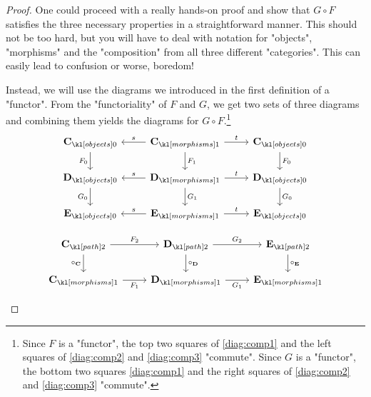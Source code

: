\documentclass[main.tex]{subfiles}
\begin{document}
\begin{proof}
	One could proceed with a really hands-on proof and show that $G \circ F$ satisfies the three necessary properties in a straightforward manner. This should not be too hard, but you will have to deal with notation for "objects", "morphisms" and the "composition" from all three different "categories". This can easily lead to confusion or worse, boredom!
	
	Instead, we will use the diagrams we introduced in the first definition of a "functor". From the "functoriality" of $F$ and $G$, we get two sets of three diagrams and combining them yields the diagrams for $G \circ F$.\footnote{Since $F$ is a "functor", the top two squares of \eqref{diag:comp1} and the left squares of \eqref{diag:comp2} and \eqref{diag:comp3} "commute". Since $G$ is a "functor", the bottom two squares \eqref{diag:comp1} and the right squares of \eqref{diag:comp2} and \eqref{diag:comp3} "commute".}
	\begin{equation}\label{diag:comp1}
		\begin{tikzcd}
			\obj{\mathbf{C}} \arrow[d, "F_0"'] & \mor{\mathbf{C}} \arrow[d, "F_1"] \arrow[r, "t"] \arrow[l, "s"'] & \obj{\mathbf{C}} \arrow[d, "F_0"] \\
			\obj{\mathbf{D}} \arrow[d, "G_0"'] & \mor{\mathbf{D}} \arrow[d, "G_1"] \arrow[r, "t"] \arrow[l, "s"'] & \obj{\mathbf{D}} \arrow[d, "G_0"] \\
			\obj{\mathbf{E}}                   & \mor{\mathbf{E}} \arrow[r, "t"] \arrow[l, "s"']                  & \obj{\mathbf{E}}                 
		\end{tikzcd}
	\end{equation}
	\begin{minipage}{0.49\textwidth}
		\begin{equation}\label{diag:comp2}
			\begin{tikzcd}
				\mortwo{\mathbf{C}} \arrow[r, "F_2"] \arrow[d, "\circ_{\mathbf{C}}"'] & \mortwo{\mathbf{D}} \arrow[r, "G_2"] \arrow[d, "\circ_{\mathbf{D}}"] & \mortwo{\mathbf{E}} \arrow[d, "\circ_{\mathbf{E}}"] \\
				\mor{\mathbf{C}} \arrow[r, "F_1"']                      & \mor{\mathbf{D}} \arrow[r, "G_1"']                     & \mor{\mathbf{E}}                     
			\end{tikzcd}
		\end{equation}
	\end{minipage}
	\begin{minipage}{0.49\textwidth}
			\begin{equation}\label{diag:comp3}

\end{equation}
\end{minipage}
\end{proof}
\end{document}
